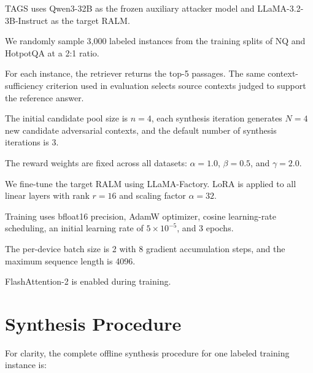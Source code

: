 \documentclass[11pt]{article}
\begin{document}
TAGS uses Qwen3-32B as the frozen auxiliary attacker model and LLaMA-3.2-3B-Instruct as the target RALM.

We randomly sample 3,000 labeled instances from the training splits of NQ and HotpotQA at a 2:1 ratio.

For each instance, the retriever returns the top-5 passages. 
The same context-sufficiency criterion used in evaluation selects source contexts judged to support the reference answer.

The initial candidate pool size is $n=4$, each synthesis iteration generates $N=4$ new candidate adversarial contexts, and the default number of synthesis iterations is 3.

The reward weights are fixed across all datasets:
$\alpha=1.0$, $\beta=0.5$, and $\gamma=2.0$.

We fine-tune the target RALM using LLaMA-Factory.
LoRA is applied to all linear layers with rank $r=16$ and scaling factor $\alpha=32$.

Training uses bfloat16 precision, AdamW optimizer, cosine learning-rate scheduling, an initial learning rate of $5\times10^{-5}$, and 3 epochs.

The per-device batch size is 2 with 8 gradient accumulation steps, and the maximum sequence length is 4096.

FlashAttention-2 is enabled during training.


\section{Synthesis Procedure}

For clarity, the complete offline synthesis procedure for one labeled training instance is:
\end{document}
